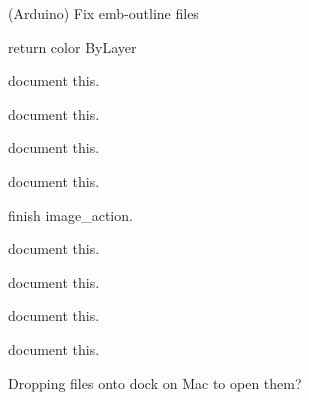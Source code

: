 \begin{DoxyRefList}
\label{todo__todo000415}%
%
(Arduino) Fix emb-\/outline files 
\item[Member \mbox{\hyperlink{imgui__main_8c_adcae0cbecb600049c6dedd95cd9930cd}{get\+Current\+Color}} (void)]\label{todo__todo000176}%
%
return color By\+Layer  
\item[Member \mbox{\hyperlink{imgui__main_8c_ab3b613d0d567021e164a02be665b5400}{grid\+\_\+color\+\_\+action}} (void)]\label{todo__todo000128}%
%
document this.  
\item[Member \mbox{\hyperlink{imgui__main_8c_a61193ac4a9ec8dd4bc18dced3c4a3abd}{heart\+\_\+init}} (void)]\label{todo__todo000214}%
%
document this.  
\item[Member \mbox{\hyperlink{imgui__main_8c_a80a32bba36fcac6f698e1036d5291c31}{Help}} (void)]\label{todo__todo000183}%
%
document this.  
\item[Member \mbox{\hyperlink{imgui__main_8c_af6ea106335ef929038c6a971fe45e764}{horizontal\+\_\+dimension\+\_\+action}} (void)]\label{todo__todo000190}%
%
document this.  
\item[Member \mbox{\hyperlink{imgui__main_8c_a522cad9c8b9672f085d6f3ffc0f6d67f}{image\+\_\+action}} (void)]\label{todo__todo000192}%
%
finish image\+\_\+action.  
\item[Member \mbox{\hyperlink{imgui__main_8c_a6e4c300aad52822a324a91edae2235b6}{Index}} ]\label{todo__todo000004}%
%
document this.  
\item[Member \mbox{\hyperlink{imgui__main_8c_ac4aeb4daa04ff262b2f2fd479dc0e98f}{Index\+Entry}} ]\label{todo__todo000003}%
%
document this.  
\item[Member \mbox{\hyperlink{imgui__main_8c_a100c6200e6b8744a8f92f6559f73b8b3}{infinite\+\_\+line\+\_\+action}} (void)]\label{todo__todo000144}%
%
document this.  
\item[Member \mbox{\hyperlink{imgui__main_8c_a5bc05721ad6272097545a51c437dc81e}{init\+\_\+command}} (void)]\label{todo__todo000181}%
%
document this.  
\item[Member \mbox{\hyperlink{imgui__main_8c_a5bf845222a9932ec353859701d62474b}{init\+\_\+view}} (void)]\label{todo__todo000083}%
%
Dropping files onto dock on Mac to open them?


\end{DoxyRefList}
